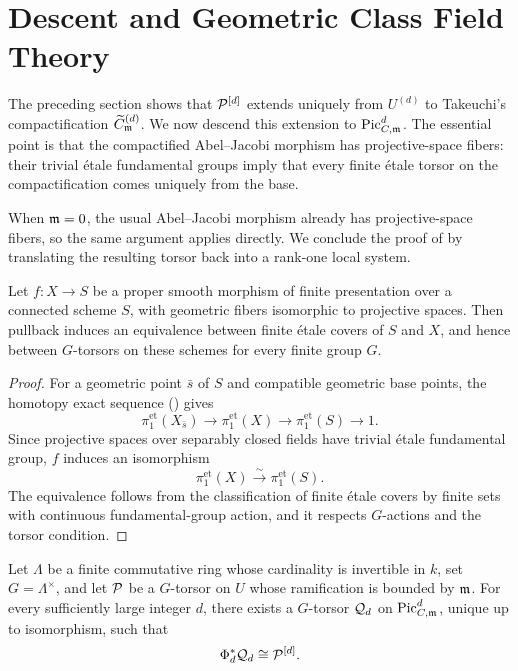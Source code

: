\section{Descent and Geometric Class Field Theory}\label{section:gcft-descent}

The preceding section shows that $\cP^{[d]}$ extends uniquely from
$U^{(d)}$ to Takeuchi's compactification $\Cmod{d}$. We now descend this
extension to $\PicCm[d]$. The essential point is that the compactified
Abel--Jacobi morphism has projective-space fibers: their trivial \'etale
fundamental groups imply that every finite \'etale torsor on the
compactification comes uniquely from the base.

When $\mdls=0$, the usual Abel--Jacobi morphism already has
projective-space fibers, so the same argument applies directly. We conclude
the proof of  by translating the
resulting torsor back into a rank-one local system.

\begin{lemma}
\label{lemma:projective-space-fiber-descent}
Let $f\colon X\to S$ be a proper smooth morphism of finite presentation
over a connected scheme $S$, with geometric fibers isomorphic to projective
spaces. Then pullback induces an equivalence between finite \'etale covers
of $S$ and $X$, and hence between $G$-torsors on these schemes for every
finite group $G$.
\end{lemma}
\begin{proof}
For a geometric point $\bar s$ of $S$ and compatible geometric base points,
the homotopy exact sequence () gives
\[
\pi_1^{\mathrm{et}}(X_{\bar s})\longrightarrow
\pi_1^{\mathrm{et}}(X)\longrightarrow
\pi_1^{\mathrm{et}}(S)\longrightarrow 1.
\]
Since projective spaces over separably closed fields have trivial \'etale
fundamental group, $f$ induces an isomorphism
\[
\pi_1^{\mathrm{et}}(X)\xrightarrow{\sim}\pi_1^{\mathrm{et}}(S).
\]
The equivalence follows from the classification of finite \'etale covers by
finite sets with continuous fundamental-group action, and it respects
$G$-actions and the torsor condition.
\end{proof}

\begin{theorem}\label{thm:GCFT_torsors}
Let $\Lambda$ be a finite commutative ring whose cardinality is invertible
in $k$, set $G=\Lambda^\times$, and let $\cP$ be a $G$-torsor on $U$ whose
ramification is bounded by $\mdls$. For every sufficiently large integer
$d$, there exists a $G$-torsor $\cQ_d$ on $\PicCm[d]$, unique up to
isomorphism, such that
\[
\Phi_d^*\cQ_d\cong\cP^{[d]}.
\]
\end{theorem}

